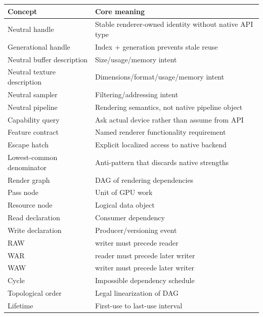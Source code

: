 {\def\LTcaptype{none} %
\begin{longtable}[]{@{}
  >{\raggedright\arraybackslash}p{}
  >{\raggedright\arraybackslash}p{}@{}}
\toprule\noalign{}
\begin{minipage}[b]{\linewidth}\raggedright
Concept
\end{minipage} & \begin{minipage}[b]{\linewidth}\raggedright
Core meaning
\end{minipage} \\
\midrule\noalign{}
\endhead
\bottomrule\noalign{}
\endlastfoot
Neutral handle & Stable renderer-owned identity without native API type \\
Generational handle & Index + generation prevents stale reuse \\
Neutral buffer description & Size/usage/memory intent \\
Neutral texture description & Dimensions/format/usage/memory intent \\
Neutral sampler & Filtering/addressing intent \\
Neutral pipeline & Rendering semantics, not native pipeline object \\
Capability query & Ask actual device rather than assume from API \\
Feature contract & Named renderer functionality requirement \\
Escape hatch & Explicit localized access to native backend \\
Lowest-common denominator & Anti-pattern that discards native strengths \\
Render graph & DAG of rendering dependencies \\
Pass node & Unit of GPU work \\
Resource node & Logical data object \\
Read declaration & Consumer dependency \\
Write declaration & Producer/versioning event \\
RAW & writer must precede reader \\
WAR & reader must precede later writer \\
WAW & writer must precede later writer \\
Cycle & Impossible dependency schedule \\
Topological order & Legal linearization of DAG \\
Lifetime & First-use to last-use interval \\

\end{longtable}}
